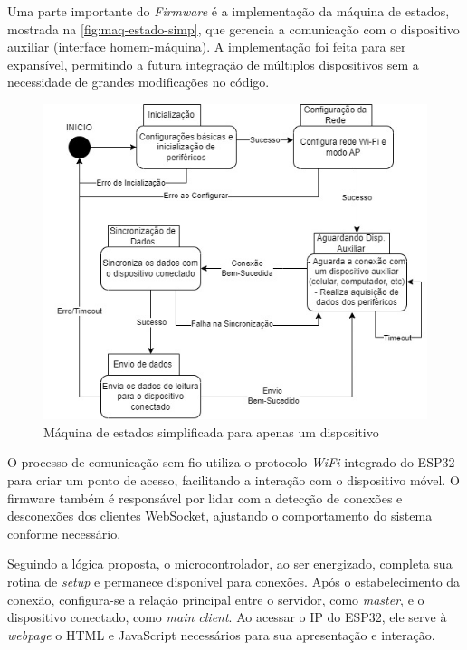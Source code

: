 Uma parte importante do \textit{Firmware} é a implementação da máquina de estados, mostrada na \autoref{fig:maq-estado-simp}, que gerencia a comunicação com o dispositivo auxiliar (interface homem-máquina). A implementação foi feita para ser expansível, permitindo a futura integração de múltiplos dispositivos sem a necessidade de grandes modificações no código.

\begin{figure}[htb!]
    \caption{Máquina de estados simplificada para apenas um dispositivo}
    \label{fig:maq-estado-simp}
    \includegraphics[width=1.0\textwidth]{figuras/Maquina-Estados-Simplificada.jpg}
    \fonte{}
\end{figure}

O processo de comunicação sem fio utiliza o protocolo \textit{WiFi} integrado do ESP32 para criar um ponto de acesso, facilitando a interação com o dispositivo móvel. O firmware também é responsável por lidar com a detecção de conexões e desconexões dos clientes WebSocket, ajustando o comportamento do sistema conforme necessário.

Seguindo a lógica proposta, o microcontrolador, ao ser energizado, completa sua rotina de \textit{setup} e permanece disponível para conexões. Após o estabelecimento da conexão, configura-se a relação principal entre o servidor, como \textit{master}, e o dispositivo conectado, como \textit{main client}. Ao acessar o IP do ESP32, ele serve à \textit{webpage} o HTML e JavaScript necessários para sua apresentação e interação.

